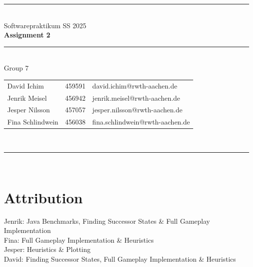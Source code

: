 \documentclass[a4paper,12pt]{article}
\begin{document}
\begin{center}
	\rule{\textwidth}{0.1pt}\\[1cm]
	
	\Large Softwarepraktikum SS 2025\\\bf Assignment 2
\end{center}


\begin{center}
	\rule{\textwidth}{0.1pt}\\[0.5cm]
	{\Large Group 7\\[5mm]}
	\begin{tabular}{lll}
		David Ichim & 459591 & david.ichim@rwth-aachen.de \\
		Jenrik Meisel & 456942 & jenrik.meisel@rwth-aachen.de \\
		Jesper Nilsson & 457057 & jesper.nilsson@rwth-aachen.de \\
		Fina Schlindwein & 456038 & fina.schlindwein@rwth-aachen.de \\
	\end{tabular}\\[0.5cm]
\end{center}

\rule{\textwidth}{0.1pt}\\[1cm]







\section{Attribution}
Jenrik: Java Benchmarks, Finding Successor States \& Full Gameplay Implementation\\
Fina: Full Gameplay Implementation \& Heuristics\\
Jesper: Heuristics \& Plotting\\
David: Finding Successor States, Full Gameplay Implementation \& Heuristics
\end{document}

